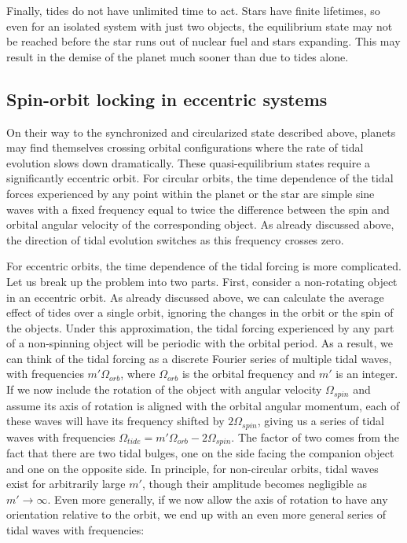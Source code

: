 Finally, tides do not have unlimited time to act. Stars have finite lifetimes,
so even for an isolated system with just two objects, the equilibrium state may
not be reached before the star runs out of nuclear fuel and stars expanding.
This may result in the demise of the planet much sooner than due to tides alone.

\subsection{Spin-orbit locking in eccentric systems}

On their way to the synchronized and circularized state described above, planets
may find themselves crossing orbital configurations where the rate of tidal
evolution slows down dramatically. These quasi-equilibrium states require a
significantly eccentric orbit. For circular orbits, the time dependence of the
tidal forces experienced by any point within the planet or the star are simple
sine waves with a fixed frequency equal to twice the difference between the spin
and orbital angular velocity of the corresponding object. As already discussed
above, the direction of tidal evolution switches as this frequency crosses zero.

For eccentric orbits, the time dependence of the tidal forcing is more
complicated. Let us break up the problem into two parts. First, consider a
non-rotating object in an eccentric orbit. As already discussed above, we can
calculate the average effect of tides over a single orbit, ignoring the changes
in the orbit or the spin of the objects. Under this approximation, the tidal
forcing experienced by any part of a non-spinning object will be periodic with
the orbital period. As a result, we can think of the tidal forcing as a discrete
Fourier series of multiple tidal waves, with frequencies $m' \Omega_{orb}$,
where $\Omega_{orb}$ is the orbital frequency and $m'$ is an integer. If we now
include the rotation of the object with angular velocity $\Omega_{spin}$ and
assume its axis of rotation is aligned with the orbital angular momentum, each
of these waves will have its frequency shifted by $2\Omega_{spin}$, giving us a
series of tidal waves with frequencies $\Omega_{tide} = m' \Omega_{orb} - 2
\Omega_{spin}$. The factor of two comes from the fact that there are two tidal
bulges, one on the side facing the companion object and one on the opposite
side. In principle, for non-circular orbits, tidal waves exist for arbitrarily
large $m'$, though their amplitude becomes negligible as $m'\rightarrow\infty$.
Even more generally, if we now allow the axis of rotation to have any
orientation relative to the orbit, we end up with an even more general series of
tidal waves with frequencies:

